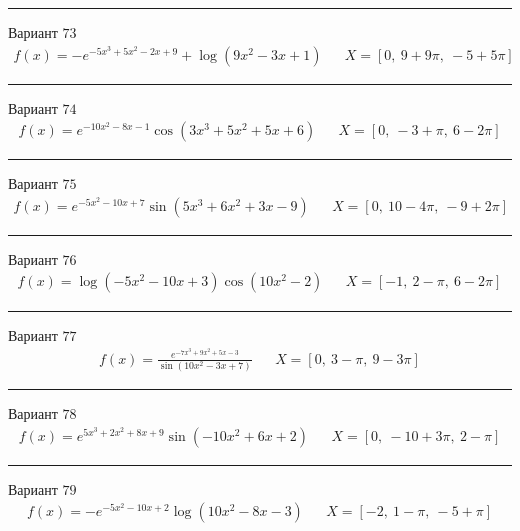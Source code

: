 \documentclass[11pt]{report}
\begin{document}
\begin{center}
    \noindent\rule{8cm}{0.4pt}
\end{center}
Вариант \(73\)
\begin{align*}
    f(x) = - e^{- 5 x^{3} + 5 x^{2} - 2 x + 9} + \log{\left(9 x^{2} - 3 x + 1 \right)} && X = \left[ 0, \  9 + 9 \pi, \  -5 + 5 \pi\right]
\end{align*}
\begin{center}
    \noindent\rule{8cm}{0.4pt}
\end{center}
Вариант \(74\)
\begin{align*}
    f(x) = e^{- 10 x^{2} - 8 x - 1} \cos{\left(3 x^{3} + 5 x^{2} + 5 x + 6 \right)} && X = \left[ 0, \  -3 + \pi, \  6 - 2 \pi\right]
\end{align*}
\begin{center}
    \noindent\rule{8cm}{0.4pt}
\end{center}
Вариант \(75\)
\begin{align*}
    f(x) = e^{- 5 x^{2} - 10 x + 7} \sin{\left(5 x^{3} + 6 x^{2} + 3 x - 9 \right)} && X = \left[ 0, \  10 - 4 \pi, \  -9 + 2 \pi\right]
\end{align*}
\begin{center}
    \noindent\rule{8cm}{0.4pt}
\end{center}
Вариант \(76\)
\begin{align*}
    f(x) = \log{\left(- 5 x^{2} - 10 x + 3 \right)} \cos{\left(10 x^{2} - 2 \right)} && X = \left[ -1, \  2 - \pi, \  6 - 2 \pi\right]
\end{align*}
\begin{center}
    \noindent\rule{8cm}{0.4pt}
\end{center}
Вариант \(77\)
\begin{align*}
    f(x) = \frac{e^{- 7 x^{3} + 9 x^{2} + 5 x - 3}}{\sin{\left(10 x^{2} - 3 x + 7 \right)}} && X = \left[ 0, \  3 - \pi, \  9 - 3 \pi\right]
\end{align*}
\begin{center}
    \noindent\rule{8cm}{0.4pt}
\end{center}
Вариант \(78\)
\begin{align*}
    f(x) = e^{5 x^{3} + 2 x^{2} + 8 x + 9} \sin{\left(- 10 x^{2} + 6 x + 2 \right)} && X = \left[ 0, \  -10 + 3 \pi, \  2 - \pi\right]
\end{align*}
\begin{center}
    \noindent\rule{8cm}{0.4pt}
\end{center}
Вариант \(79\)
\begin{align*}
    f(x) = - e^{- 5 x^{2} - 10 x + 2} \log{\left(10 x^{2} - 8 x - 3 \right)} && X = \left[ -2, \  1 - \pi, \  -5 + \pi\right]
\end{align*}
\end{document}
